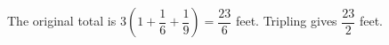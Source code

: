 The original total is $3(1+\dfrac{1}{6}+\dfrac{1}{9})=\dfrac{23}{6}$ feet. Tripling gives $\boxed{\dfrac{23}{2}}$ feet.
